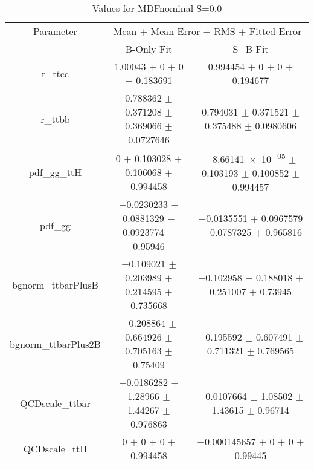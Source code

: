 \begin{table}
\centering
\caption{Values for MDFnominal S=0.0}
\begin{tabular}{ccc}
\toprule
Parameter & \multicolumn{2}{c}{Mean $\pm$ Mean Error $\pm$ RMS $\pm$ Fitted Error}\\
 & B-Only Fit & S+B Fit\\
\midrule
r\_ttcc & \num{1.00043} $\pm$ \num{0} $\pm$ \num{0} $\pm$ \num{0.183691} & \num{0.994454} $\pm$ \num{0} $\pm$ \num{0} $\pm$ \num{0.194677}\\
r\_ttbb & \num{0.788362} $\pm$ \num{0.371208} $\pm$ \num{0.369066} $\pm$ \num{0.0727646} & \num{0.794031} $\pm$ \num{0.371521} $\pm$ \num{0.375488} $\pm$ \num{0.0980606}\\
pdf\_gg\_ttH & \num{0} $\pm$ \num{0.103028} $\pm$ \num{0.106068} $\pm$ \num{0.994458} & \num{-8.66141e-05} $\pm$ \num{0.103193} $\pm$ \num{0.100852} $\pm$ \num{0.994457}\\
pdf\_gg & \num{-0.0230233} $\pm$ \num{0.0881329} $\pm$ \num{0.0923774} $\pm$ \num{0.95946} & \num{-0.0135551} $\pm$ \num{0.0967579} $\pm$ \num{0.0787325} $\pm$ \num{0.965816}\\
bgnorm\_ttbarPlusB & \num{-0.109021} $\pm$ \num{0.203989} $\pm$ \num{0.214595} $\pm$ \num{0.735668} & \num{-0.102958} $\pm$ \num{0.188018} $\pm$ \num{0.251007} $\pm$ \num{0.73945}\\
bgnorm\_ttbarPlus2B & \num{-0.208864} $\pm$ \num{0.664926} $\pm$ \num{0.705163} $\pm$ \num{0.75409} & \num{-0.195592} $\pm$ \num{0.607491} $\pm$ \num{0.711321} $\pm$ \num{0.769565}\\
QCDscale\_ttbar & \num{-0.0186282} $\pm$ \num{1.28966} $\pm$ \num{1.44267} $\pm$ \num{0.976863} & \num{-0.0107664} $\pm$ \num{1.08502} $\pm$ \num{1.43615} $\pm$ \num{0.96714}\\
QCDscale\_ttH & \num{0} $\pm$ \num{0} $\pm$ \num{0} $\pm$ \num{0.994458} & \num{-0.000145657} $\pm$ \num{0} $\pm$ \num{0} $\pm$ \num{0.99445}\\
\bottomrule
\end{tabular}
\end{table}